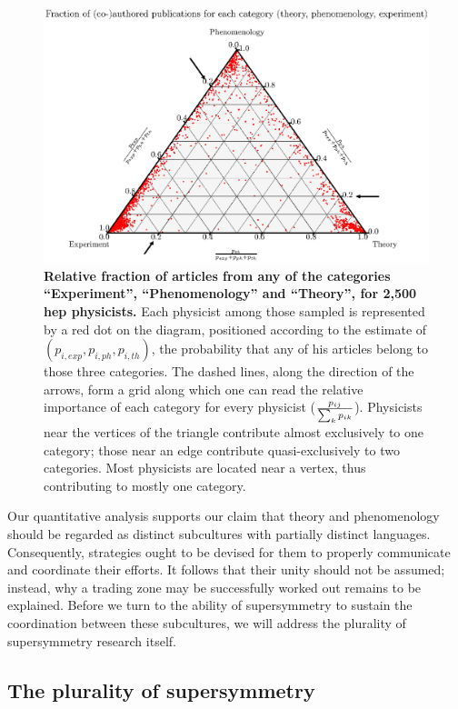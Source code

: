 \documentclass[smallextended]{svjour3}
\begin{document}
\begin{figure}
    \centering\includegraphics{Fig2.eps}
    \caption{\textbf{Relative fraction of articles from any of the categories ``Experiment'', ``Phenomenology'' and ``Theory'', for 2,500 \gls{hep} physicists.} Each physicist among those sampled is represented by a red dot on the diagram, positioned according to the estimate of $(p_{i,exp},p_{i,ph},p_{i,th})$, the probability that any of his articles belong to those three categories. The dashed lines, along the direction of the arrows, form a grid along which one can read the relative importance of each category for every physicist  ($p_{ij}\over \sum_{k}p_{ik}$). Physicists near the vertices of the triangle contribute almost exclusively to one category; those near an edge contribute quasi-exclusively to two categories. Most physicists are located near a vertex, thus contributing to mostly one category.}
    \label{fig:ternary_categories}
\end{figure}

Our quantitative analysis supports our claim that theory and phenomenology should be regarded as distinct subcultures with partially distinct languages. Consequently, strategies ought to be devised for them to properly communicate and coordinate their efforts. It follows that their unity should not be assumed; instead, why a trading zone may be successfully worked out remains to be explained. Before we turn to the ability of supersymmetry to sustain the coordination between these subcultures, we will address the plurality of supersymmetry research itself.

\subsection{The plurality of supersymmetry}
\label{section:application_plurality}
\end{document}
